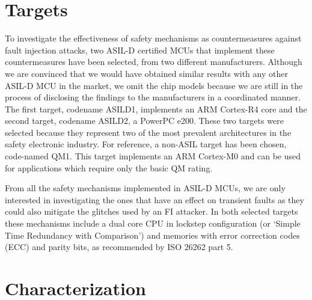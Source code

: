 \documentclass[a4paper, 10pt]{article}
\newcommand{\TI}{ASILD1\xspace}
\newcommand{\ST}{ASILD2\xspace}
\newcommand{\NXP}{QM1\xspace}
\begin{document}
\section{Targets}
To investigate the effectiveness of safety mechanisms as countermeasures against fault injection attacks, two ASIL-D certified MCUs that implement these countermeasures have been selected, from two different %
manufacturers. Although we are convinced that we would have obtained similar results with any other ASIL-D MCU in the market, we omit the chip models because we are still in the process of disclosing the findings to the manufacturers in a coordinated manner. The first target, codename \TI, implements an ARM Cortex-R4 core and the second target, codename \ST, a PowerPC e200. These two targets were selected because they represent two of the most prevalent architectures in the safety electronic industry. For reference, a non-ASIL target has been chosen, code-named \NXP. This target implements an ARM Cortex-M0 and can be used for applications which require only the basic QM rating.

From all the safety mechanisms implemented in ASIL-D MCUs, we are only interested in investigating the ones that have an effect on transient faults as they could also mitigate the glitches used by an FI attacker. In both selected targets these mechanisms include a dual core CPU in lockstep configuration (or `Simple Time Redundancy with Comparison') and memories with error correction codes (ECC) and parity bits, as recommended by ISO 26262 part 5. %


\section{Characterization}
\label{sec:char}
\end{document}
